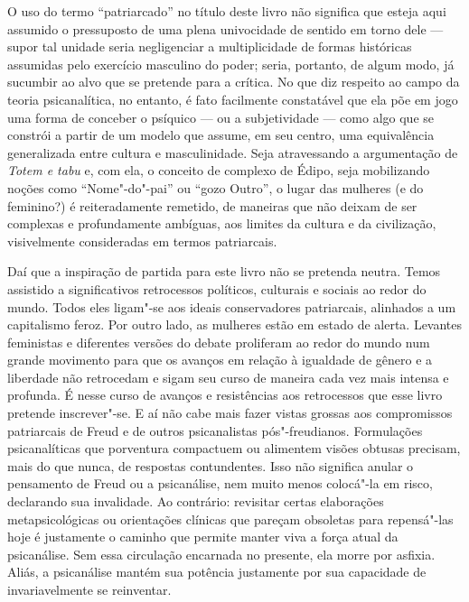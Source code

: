 O uso do termo ``patriarcado'' no título deste livro não significa que
esteja aqui assumido o pressuposto de uma plena univocidade de sentido
em torno dele --- supor tal unidade seria negligenciar a multiplicidade
de formas históricas assumidas pelo exercício masculino do poder; seria,
portanto, de algum modo, já sucumbir ao alvo que se pretende para a
crítica. No que diz respeito ao campo da teoria psicanalítica, no
entanto, é fato facilmente constatável que ela põe em jogo uma forma de
conceber o psíquico --- ou a subjetividade --- como algo que se constrói a
partir de um modelo que assume, em seu centro, uma equivalência
generalizada entre cultura e masculinidade. Seja atravessando a
argumentação de \emph{Totem e tabu} e, com ela, o conceito de complexo de
Édipo, seja mobilizando noções como ``Nome"-do"-pai'' ou ``gozo Outro'', o
lugar das mulheres (e do feminino?) é reiteradamente remetido, de
maneiras que não deixam de ser complexas e profundamente ambíguas, aos
limites da cultura e da civilização, visivelmente consideradas em termos
patriarcais.

Daí que a inspiração de partida para este livro não se pretenda neutra.
Temos assistido a significativos retrocessos políticos, culturais e
sociais ao redor do mundo. Todos eles ligam"-se aos ideais conservadores
patriarcais, alinhados a um capitalismo feroz. Por outro lado, as
mulheres estão em estado de alerta. Levantes feministas e diferentes
versões do debate proliferam ao redor do mundo num grande movimento para
que os avanços em relação à igualdade de gênero e a liberdade não
retrocedam e sigam seu curso de maneira cada vez mais intensa e
profunda. É nesse curso de avanços e resistências aos retrocessos que
esse livro pretende inscrever"-se. E aí não cabe mais fazer vistas
grossas aos compromissos patriarcais de Freud e de outros psicanalistas
pós"-freudianos. Formulações psicanalíticas que porventura compactuem ou alimentem visões obtusas precisam, mais do que nunca, de respostas contundentes. Isso não significa anular o pensamento de Freud ou a psicanálise, nem muito menos colocá"-la em risco, declarando sua
invalidade. Ao contrário: revisitar certas elaborações metapsicológicas
ou orientações clínicas que pareçam obsoletas para repensá"-las hoje é
justamente o caminho que permite manter viva a força atual da
psicanálise. Sem essa circulação encarnada no presente, ela morre por
asfixia. Aliás, a psicanálise mantém sua potência justamente por sua
capacidade de invariavelmente se reinventar.

